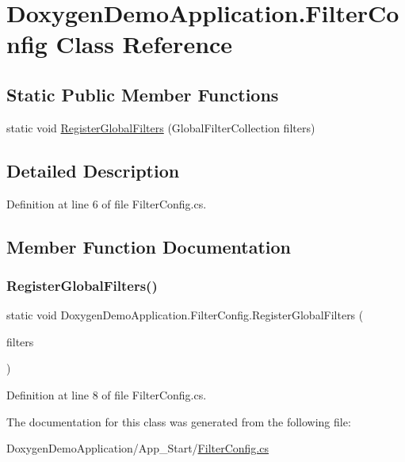 \hypertarget{class_doxygen_demo_application_1_1_filter_config}{}\section{Doxygen\+Demo\+Application.\+Filter\+Config Class Reference}
\label{class_doxygen_demo_application_1_1_filter_config}
\subsection*{Static Public Member Functions}
\begin{DoxyCompactItemize}
\item 
static void \mbox{\hyperlink{class_doxygen_demo_application_1_1_filter_config_a75ebe17224ce52689211f60390e29e02}{Register\+Global\+Filters}} (Global\+Filter\+Collection filters)
\end{DoxyCompactItemize}


\subsection{Detailed Description}


Definition at line 6 of file Filter\+Config.\+cs.



\subsection{Member Function Documentation}
\mbox{\label{class_doxygen_demo_application_1_1_filter_config_a75ebe17224ce52689211f60390e29e02}} 
\subsubsection{\texorpdfstring{Register\+Global\+Filters()}{RegisterGlobalFilters()}}
{\footnotesize\ttfamily static void Doxygen\+Demo\+Application.\+Filter\+Config.\+Register\+Global\+Filters (\begin{DoxyParamCaption}\item[{Global\+Filter\+Collection}]{filters }\end{DoxyParamCaption})\hspace{0.3cm}{\ttfamily [static]}}



Definition at line 8 of file Filter\+Config.\+cs.



The documentation for this class was generated from the following file\+:\begin{DoxyCompactItemize}
\item 
Doxygen\+Demo\+Application/\+App\+\_\+\+Start/\mbox{\hyperlink{_filter_config_8cs}{Filter\+Config.\+cs}}\end{DoxyCompactItemize}
